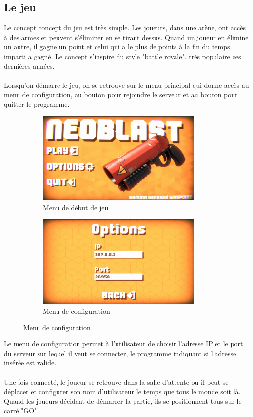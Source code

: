 \documentclass[a4paper]{article}
\begin{document}
\subsection{Le jeu}
Le concept concept du jeu est très simple. Les joueurs, dans une arène, ont accès à des armes et peuvent s’éliminer en se tirant dessus. Quand un joueur en élimine un autre, il gagne un point et celui qui a le plus de points à la fin du temps imparti a gagné. Le concept s'inspire du style "battle royale", très populaire ces dernières années. \\
\\
Lorsqu'on démarre le jeu, on se retrouve sur le menu principal qui donne accès au menu de configuration, au bouton pour rejoindre le serveur et au bouton pour quitter le programme.

\begin{figure}[h]
    \begin{subfigure}{0.5\textwidth}
        \includegraphics[width=0.9\textwidth]{images/game/start_menu.png}
        \caption{Menu de début de jeu}
        \label{fig:start_menu}
    \end{subfigure}
        \begin{subfigure}{0.5\textwidth}
        \includegraphics[width=0.9\textwidth]{images/game/option_menu.png}
        \caption{Menu de configuration}
        \label{fig:option_menu}
    \end{subfigure}
\end{figure}
Le menu de configuration permet à l'utilisateur de choisir l'adresse IP et le port du serveur sur lequel il veut se connecter, le programme indiquant si l'adresse insérée est valide.\\
\\
Une fois connecté, le joueur se retrouve dans la salle d'attente ou il peut se déplacer et configurer son nom d'utilisateur le temps que tous le monde soit là. Quand les joueurs décident de démarrer la partie, ils se positionnent tous sur le carré "GO".
\end{document}
